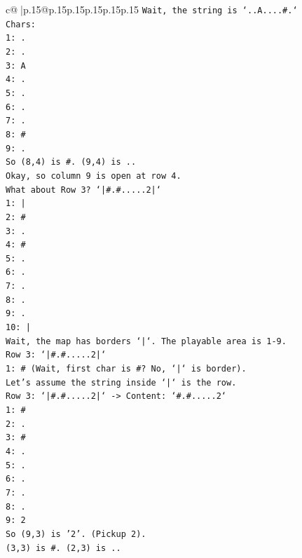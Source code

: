 \documentclass{article}
\begin{document}
{\begin{supertabular}{c@{$\;$}|p{.15\linewidth}@{}p{.15\linewidth}p{.15\linewidth}p{.15\linewidth}p{.15\linewidth}p{.15\linewidth}}
{{{\texttt{Wait, the string is `..A....\#.`} \\
\texttt{Chars:} \\
\texttt{1: .} \\
\texttt{2: .} \\
\texttt{3: A} \\
\texttt{4: .} \\
\texttt{5: .} \\
\texttt{6: .} \\
\texttt{7: .} \\
\texttt{8: \#} \\
\texttt{9: .} \\
\texttt{So (8,4) is \#. (9,4) is ..} \\
\texttt{Okay, so column 9 is open at row 4.} \\
\texttt{What about Row 3? `|\#.\#.....2|`} \\
\texttt{1: |} \\
\texttt{2: \#} \\
\texttt{3: .} \\
\texttt{4: \#} \\
\texttt{5: .} \\
\texttt{6: .} \\
\texttt{7: .} \\
\texttt{8: .} \\
\texttt{9: .} \\
\texttt{10: |} \\
\texttt{Wait, the map has borders `|`. The playable area is 1{-}9.} \\
\texttt{Row 3: `|\#.\#.....2|`} \\
\texttt{1: \# (Wait, first char is \#? No, `|` is border).} \\
\texttt{Let's assume the string inside `|` is the row.} \\
\texttt{Row 3: `|\#.\#.....2|` {-}> Content: `\#.\#.....2`} \\
\texttt{1: \#} \\
\texttt{2: .} \\
\texttt{3: \#} \\
\texttt{4: .} \\
\texttt{5: .} \\
\texttt{6: .} \\
\texttt{7: .} \\
\texttt{8: .} \\
\texttt{9: 2} \\
\texttt{So (9,3) is '2'. (Pickup 2).} \\
\texttt{(3,3) is \#. (2,3) is ..} \\
}}}
\end{supertabular}}
\end{document}
